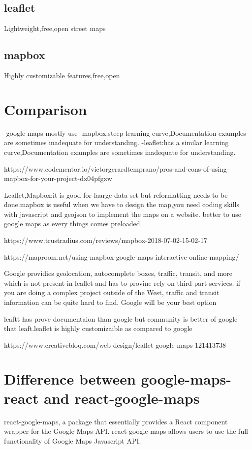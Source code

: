 \documentclass{article}
\begin{document}
\subsection{leaflet}Lightweight,free,open street maps
\subsection{mapbox}Highly customizable features,free,open

\section{Comparison}
-google maps mostly use
-mapbox:steep learning curve,Documentation examples are sometimes inadequate for understanding.
-leaflet:has a similar learning curve,Documentation examples are sometimes inadequate for understanding.

https://www.codementor.io/victorgerardtemprano/pros-and-cons-of-using-mapbox-for-your-project-dx04pfgxw

Leaflet,Mapbox:it is good for laarge data set but reformatting needs to be done.mapbox is useful when we have to design the map,you need coding skills with javascript and geojson to implement the maps on a website.
better to use google maps as every things comes preloaded.

https://www.trustradius.com/reviews/mapbox-2018-07-02-15-02-17

https://maproom.net/using-mapbox-google-maps-interactive-online-mapping/



Google providies geolocation, autocomplete boxes, traffic, transit, and more which is not present in leaflet and has to provine rely on third part services.
if you are doing a complex project outside of the West, traffic and transit information can be quite hard to find. Google will be your best option

leaftt has prove documentaion than google but community is better of google that leaft.leaflet is highly customizaible as compared to google



https://www.creativebloq.com/web-design/leaflet-google-maps-121413738

\section{Difference between  google-maps-react and react-google-maps}
react-google-maps, a package that essentially provides a React component wrapper for the Google Maps API. react-google-maps allows users to use the full functionality of Google Maps Javascript API.
\end{document}
